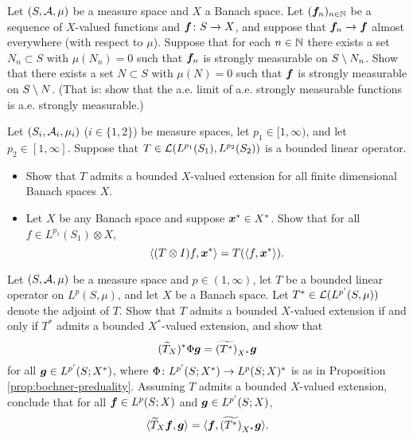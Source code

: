 \begin{exercise}\label{ex:sm-limits}
  Let $(S,\mathcal{A},\mu)$ be a measure space and $X$ a Banach space.
  Let $(\bm{f}_{n})_{n \in \mathbb{N}}$ be a sequence of $X$-valued functions and $\bm{f} \colon S \rightarrow X$, and suppose that $\bm{f}_{n} \to \bm{f}$ almost everywhere (with respect to $\mu$).
  Suppose that for each $n \in \mathbb{N}$ there exists a set $N_{n} \subset S$ with $\mu(N_{n}) = 0$ such that $\bm{f}_{n}$ is strongly measurable on $S \setminus N_{n}$.
  Show that there exists a set $N \subset S$ with $\mu(N) = 0$ such that $\bm{f}$ is strongly measurable on $S \setminus N$.
  (That is: show that the a.e. limit of a.e. strongly measurable functions is a.e. strongly measurable.)
\end{exercise}

\begin{exercise}\label{ex:tensor-extension-basic-props}
  Let $(S_i, \mathcal{A}_i, \mu_i)$ ($i \in \{1,2\}$) be measure spaces, let $p_1 \in [1,\infty)$, and let $p_2 \in [1,\infty]$.
  Suppose that $T \in \mathcal{L}(L^{p_1}(S_1), L^{p_2}(S_2))$ is a bounded linear operator.
  \begin{itemize}
  \item{}
    Show that $T$ admits a bounded $X$-valued extension for all finite dimensional Banach spaces $X$.
  \item{}
    Let $X$ be any Banach space and suppose $\bm{x}^* \in X^*$.
    Show that for all $f \in L^{p_1}(S_1) \otimes X$,
    \begin{equation*}
      \langle (T \otimes I)f, \bm{x}^* \rangle = T(\langle f, \bm{x}^* \rangle).
    \end{equation*}
  \end{itemize}

\end{exercise}

\begin{exercise}\label{ex:tensor-adjoint}
  Let $(S,\mathcal{A},\mu)$ be a measure space and $p \in (1,\infty)$, let $T$ be a bounded linear operator on $L^p(S,\mu)$, and let $X$ be a Banach space.
  Let $T^*  \in \mathcal{L}(L^{p'}(S,\mu))$ denote the adjoint of $T$.
  Show that $T$ admits a bounded $X$-valued extension if and only if $T^*$ admits a bounded $X^*$-valued extension, and show that
  \begin{equation*}
    (\widetilde{T}_X)^* \Phi \bm{g} = \widetilde{(T^*)}_{X^*} \bm{g}
  \end{equation*}
  for all $\bm{g} \in L^{p'}(S;X^*)$, where $\Phi \colon L^{p'}(S;X^*) \rightarrow L^p(S;X)^*$ is as in Proposition \ref{prop:bochner-preduality}.
  Assuming $T$ admits a bounded $X$-valued extension, conclude that for all $\bm{f} \in L^p(S;X)$ and $\bm{g} \in L^{p'}(S;X)$,
  \begin{equation}\label{eq:tensor-adjoint-identity}
    \langle \widetilde{T}_X \bm{f}, \bm{g} \rangle = \langle \bm{f}, \widetilde{(T^*)}_{X^*} \bm{g} \rangle.
  \end{equation}
\end{exercise}

